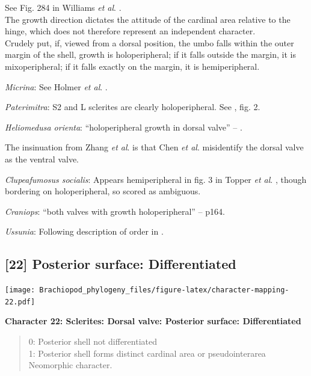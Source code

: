 \documentclass[]{book}
\theoremstyle{definition}
\theoremstyle{definition}
\theoremstyle{definition}
\theoremstyle{remark}
\begin{document}
See Fig. 284 in Williams \emph{et al}.
\citeyearpar{Williams1997BrachiopodaRevised}.\\
The growth direction dictates the attitude of the cardinal area relative
to the hinge, which does not therefore represent an independent
character.\\
Crudely put, if, viewed from a dorsal position, the umbo falls within
the outer margin of the shell, growth is holoperipheral; if it falls
outside the margin, it is mixoperipheral; if it falls exactly on the
margin, it is hemiperipheral.

\emph{Micrina}: See Holmer \emph{et al}.
\citeyearpar{Holmer2008TheEarly}.

\emph{Paterimitra}: S2 and L sclerites are clearly holoperipheral. See
\citet{Larsson2014iPaterimitra}, fig. 2.

\emph{Heliomedusa orienta}: ``holoperipheral growth in dorsal valve'' --
\citet{Williams2007PartH}.

The insinuation from Zhang \emph{et al}.
\citeyearpar{Zhang2009Architectureand} is that Chen \emph{et al}.
\citeyearpar{Chen2007Reinterpretationof} misidentify the dorsal valve as
the ventral valve.

\emph{Clupeafumosus socialis}: Appears hemiperipheral in fig. 3 in
Topper \emph{et al}. \citeyearpar{Topper2013Reappraisalof}, though
bordering on holoperipheral, so scored as ambiguous.

\emph{Craniops}: ``both valves with growth holoperipheral'' --
\citet{Williams2000BrachiopodaLinguliformea} p164.

\emph{Ussunia}: Following description of order in
\citet{Williams2000BrachiopodaLinguliformea}.

\hypertarget{posterior-surface-differentiated}{%
\subsection*{{[}22{]} Posterior surface:
Differentiated}\label{posterior-surface-differentiated}}

\texttt{[image: Brachiopod\_phylogeny\_files/figure-latex/character-mapping-22.pdf]}

\textbf{Character 22: Sclerites: Dorsal valve: Posterior surface:
Differentiated}

\begin{quote}
0: Posterior shell not differentiated\\
1: Posterior shell forms distinct cardinal area or pseudointerarea\\
Neomorphic character.
\end{quote}
\end{document}
